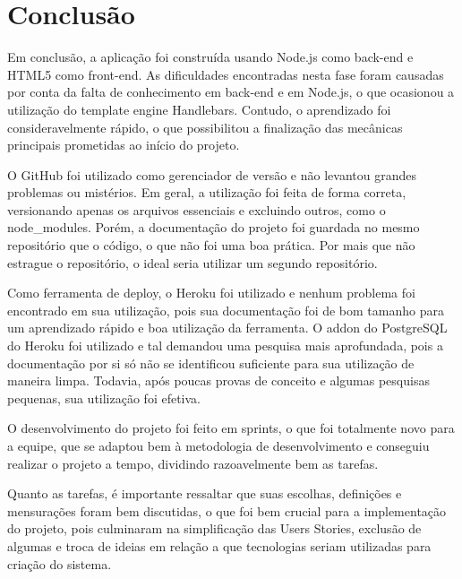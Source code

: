\chapter*[Conclusão]{Conclusão}
Em conclusão, a aplicação foi construída usando Node.js como back-end e HTML5 como front-end. As dificuldades encontradas nesta fase foram causadas por conta da falta de conhecimento em back-end e em Node.js, o que ocasionou a utilização do template engine Handlebars. Contudo, o aprendizado foi consideravelmente rápido, o que possibilitou a finalização das mecânicas principais prometidas ao início do projeto.

O GitHub foi utilizado como gerenciador de versão e não levantou grandes problemas ou mistérios. Em geral, a utilização foi feita de forma correta, versionando apenas os arquivos essenciais e excluindo outros, como o node\_modules. Porém, a documentação do projeto foi guardada no mesmo repositório que o código, o que não foi uma boa prática. Por mais que não estrague o repositório, o ideal seria utilizar um segundo repositório.

Como ferramenta de deploy, o Heroku foi utilizado e nenhum problema foi encontrado em sua utilização, pois sua documentação foi de bom tamanho para um aprendizado rápido e boa utilização da ferramenta. O addon do PostgreSQL do Heroku foi utilizado e tal demandou uma pesquisa mais aprofundada, pois a documentação por si só não se identificou suficiente para sua utilização de maneira limpa. Todavia, após poucas provas de conceito e algumas pesquisas pequenas, sua utilização foi efetiva.

O desenvolvimento do projeto foi feito em sprints, o que foi totalmente novo para a equipe, que se adaptou bem à metodologia de desenvolvimento e conseguiu realizar o projeto a tempo, dividindo razoavelmente bem as tarefas. 

Quanto as tarefas, é importante ressaltar que suas escolhas, definições e mensurações foram bem discutidas, o que foi bem crucial para a implementação do projeto, pois culminaram na simplificação das Users Stories, exclusão de algumas e troca de ideias em relação a que tecnologias seriam utilizadas para criação do sistema.


